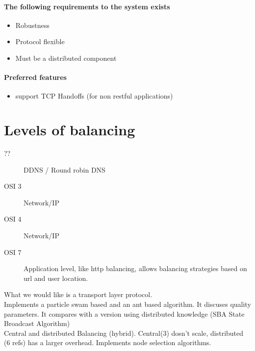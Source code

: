 \paragraph{The following requirements to the system exists}
\begin{itemize}
	\item Robustness
	\item Protocol flexible
	\item Must be a distributed component
\end{itemize}

\paragraph{Preferred features}
\begin{itemize}
	\item support TCP Handoffs (for non restful applications)
\end{itemize}

\section{Levels of balancing}
\begin{description}
	\item[??] DDNS / Round robin DNS
	\item[OSI 3] Network/IP %
	\item[OSI 4] Network/IP
	\item[OSI 7] {Application level, like http balancing, allows balancing strategies based on url and user location.}
\end{description}

What we would like is a transport layer protocol.
\\

\noindent\cite{Ludwig:SwarmIntelligenceGridLoadBalancing} 
Implements a particle swam based and an ant based algorithm. 
It discuses quality parameters.
It compares with a version using distributed knowledge (SBA State Broadcast Algorithm)
\\

\noindent\cite{MayuriMehta:HybridDynamicLB} Central and distributed Balancing (hybrid). Central(3) dosn't scale, distributed (6 refs) has a larger overhead. Implements node selection algorithms.



